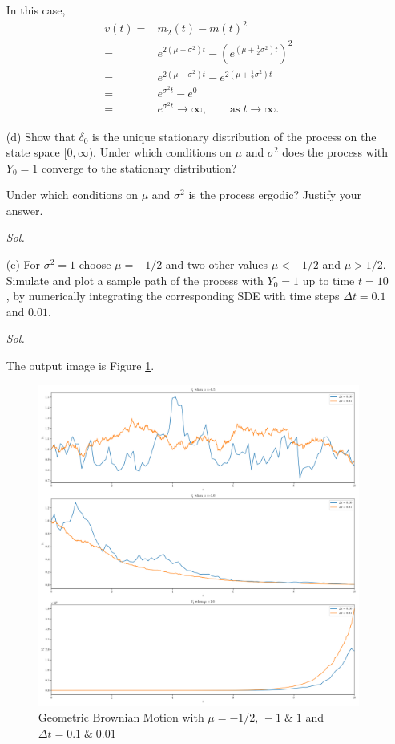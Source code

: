 \begin{enumerate}
        In this case,
        \begin{align*}
            v(t) = & m_2(t) - m(t)^2 \\ 
            = & e^{2(\mu + \sigma^2)t} - \left( e^{(\mu+ \frac{1}{2} \sigma^2) t} \right)^2 \\ 
            = & e^{2(\mu + \sigma^2)t} - e^{2( \mu + \frac{1}{2}\sigma^2)t} \\ 
            = & e^{\sigma^2 t} - e^{0} \\ 
            = & e^{\sigma^2 t} \to \infty, \qquad \text{as} \; t \to \infty.
        \end{align*}

    \item[(d)] Show that $\delta_0$ is the unique stationary distribution of the process on the state space $[0, \infty)$. Under which conditions on $\mu$ and $\sigma^2$ does the process with $Y_0 = 1$ converge to the stationary distribution?
    
    Under which conditions on $\mu$ and $\sigma^2$ is the process ergodic? Justify your answer.

        \textit{ Sol. } 

    \item[(e)] For $\sigma^2 = 1$ choose $\mu = -1/2$ and two other values $\mu < -1/2$ and $\mu > 1/2$. Simulate and plot a sample path of the process with $Y_0 = 1$ up to time $t = 10$, by numerically integrating the corresponding SDE with time steps $\Delta t = 0.1$ and $0.01$.
    
        \textit{ Sol. }
        
        The output image is Figure \ref{fig1}.
        \begin{figure}[!htbp]
            \includegraphics[width=18cm]{./Programming/Q3-1-D.png}
            \caption{Geometric Brownian Motion with $\mu = -1/2, \, -1 \; \& \; 1$ and $\Delta t = 0.1 \; \& \; 0.01$}
            \label{fig1}
        \end{figure}

\end{enumerate}
